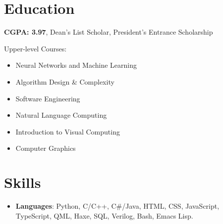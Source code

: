 {	\section{Education}
	\begin{itemize}
        \setlength\itemsep{0pt}
        \item \textbf{CGPA: 3.97}, Dean's List Scholar, President's Entrance Scholarship
        {
        \footnotesize
        \item  Upper-level Courses:
        \setlength\multicolsep{0pt}
        \begin{multicols}{3}
        \begin{itemize} \setlength\itemsep{0pt}
            \item Neural Networks and Machine Learning
            \item Algorithm Design \& Complexity
            \item Software Engineering
            \item Natural Language Computing 
            \item Introduction to Visual Computing
            \item Computer Graphics
        \end{itemize}
        \end{multicols}
        }
    \end{itemize}

	\section{Skills}
	{
    \begin{itemize} \setlength\itemsep{0pt}
    \item
        \textbf{Languages}:
        Python, 
        C/C++, 
        C\#/Java, 
        HTML, 
        CSS, 
        JavaScript,
        TypeScript,
        QML,
        Haxe, 
        SQL,
        Verilog,
        Bash,
        Emacs Lisp.


\end{itemize}}}
